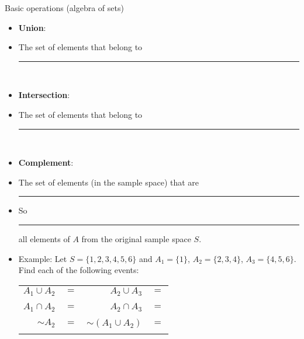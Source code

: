 \documentclass{article}
\newcommand{\blankul}[1]{\rule[-1.5mm]{#1}{0.15mm}}	%
\newcommand{\comp}[1]{{\sim}#1}		%
\begin{document}
Basic operations (algebra of sets)\bigskip
\begin{itemize}
    \item \textbf{Union}:
    \item[] The set of elements that belong to \blankul{5cm} \vspace{50pt}\\
    \item \textbf{Intersection}:
    \item[] The set of elements that belong to \blankul{5cm} \vspace{50pt}\\
    \item \textbf{Complement}:
    \item[] The set of elements (in the sample space) that are \blankul{3cm}
    \item[] So \blankul{2cm} all elements of $A$ from the original sample space $S$. \vspace{50pt}\\
    \item Example: Let $S = \{1, 2, 3, 4, 5, 6\}$ \quad and \quad $A_1 = \{1\}$, $A_2 = \{2, 3, 4\}$, $A_3 = \{4, 5, 6\}$. Find each of the following events:\bigskip\\
    \begin{tabular}{r l r l}
        $A_1 \cup A_2$ & $=$ \hspace{150pt} & $A_2 \cup A_3$ & $=$\\\\
        $A_1 \cap A_2$ & $=$\hspace{150pt} & $A_2 \cap A_3$ & $=$\\\\
        $\comp{A_2}$ & $=$ \hspace{150pt} & $\comp{(A_1 \cup A_2)}$ & $=$\\\\
    \end{tabular}
\end{itemize}\bigskip
\end{document}
